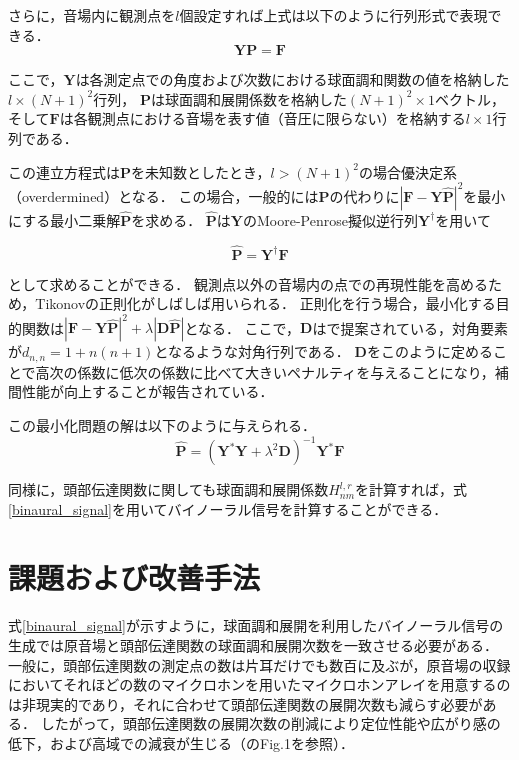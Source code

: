 \documentclass[a4paper]{jsarticle}
\begin{document}
さらに，音場内に観測点を$l$個設定すれば上式は以下のように行列形式で表現できる．
$$
    \mathbf{Y P}=\mathbf{F}
$$

ここで，$\mathbf{Y}$は各測定点での角度および次数における球面調和関数の値を格納した$l \times (N+1)^2$行列，
$\mathbf{P}$は球面調和展開係数を格納した$(N+1)^2 \times 1$ベクトル，
そして$\mathbf{F}$は各観測点における音場を表す値（音圧に限らない）を格納する$l \times 1$行列である．

この連立方程式は$\mathbf{P}$を未知数としたとき，$l > (N+1)^2$の場合優決定系（overdermined）となる．
この場合，一般的には$\mathbf{P}$の代わりに$|\mathbf{F} - \mathbf{Y}\hat{\mathbf{P}}|^2$を最小にする最小二乗解$\hat{\mathbf{P}}$を求める．
$\hat{\mathbf{P}}$は$\mathbf{Y}$のMoore-Penrose擬似逆行列$\mathbf{Y}^\dagger$を用いて

$$
    \hat{\boldsymbol{P}}=\boldsymbol{Y}^{\dagger} \boldsymbol{F}
$$

として求めることができる．
観測点以外の音場内の点での再現性能を高めるため，Tikonovの正則化がしばしば用いられる．
正則化を行う場合，最小化する目的関数は$|\boldsymbol{F}-\boldsymbol{Y} \hat{\boldsymbol{P}}|^{2}+\lambda|\boldsymbol{D} \hat{\boldsymbol{P}}|$となる．
ここで，$\mathbf{D}$は\cite{Duraiswaini2004-fy}で提案されている，対角要素が$d_{n, n} = 1 + n(n+1)$となるような対角行列である．
$\mathbf{D}$をこのように定めることで高次の係数に低次の係数に比べて大きいペナルティを与えることになり，補間性能が向上することが報告されている\cite{Duraiswaini2004-fy}．

この最小化問題の解は以下のように与えられる．
$$
    \hat{\boldsymbol{P}}=\left(\boldsymbol{Y}^{*} \boldsymbol{Y}+\lambda^{2} \boldsymbol{D}\right)^{-1} \boldsymbol{Y}^{*} \boldsymbol{F}
$$

同様に，頭部伝達関数に関しても球面調和展開係数$H_{nm}^{l, r}$を計算すれば，式\ref{binaural_signal}を用いてバイノーラル信号を計算することができる．

\section{課題および改善手法}
式\ref{binaural_signal}が示すように，球面調和展開を利用したバイノーラル信号の生成では原音場と頭部伝達関数の球面調和展開次数を一致させる必要がある．
一般に，頭部伝達関数の測定点の数は片耳だけでも数百に及ぶが，原音場の収録においてそれほどの数のマイクロホンを用いたマイクロホンアレイを用意するのは非現実的であり，それに合わせて頭部伝達関数の展開次数も減らす必要がある．
したがって，頭部伝達関数の展開次数の削減により定位性能や広がり感の低下\cite{Avni2013-sr}，および高域での減衰が生じる\cite{Avni2013-sr, Ben-Hur2017-gm}（\cite{Ben-Hur2017-gm}のFig.1を参照）．
\end{document}
